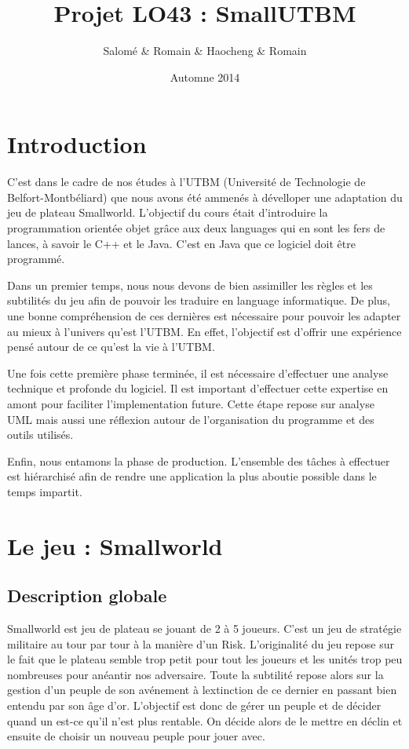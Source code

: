 \documentclass[11pt]{report}
\title{ Projet LO43 : SmallUTBM}
\author{Salomé \bsc{Welche} \& Romain \bsc{Dulieu} \& Haocheng \bsc{Xu} \& Romain \bsc{Thibaud}}
\date{Automne 2014}
\begin{document}
\maketitle

\tableofcontents

\chapter{Introduction}

C'est dans le cadre de nos études à l'UTBM (Université de Technologie de Belfort-Montbéliard) que nous avons été ammenés à dévelloper une adaptation du jeu de plateau Smallworld\up{\copyright}. L'objectif du cours était d'introduire la programmation orientée objet grâce aux deux languages qui en sont les fers de lances, à savoir le C++ et le Java. C'est en Java que ce logiciel doit être programmé. 

Dans un premier temps, nous nous devons de bien assimiller les règles et les subtilités du jeu afin de pouvoir les traduire en language informatique. De plus, une bonne compréhension de ces dernières est nécessaire pour pouvoir les adapter au mieux à l'univers qu'est l'UTBM. En effet, l'objectif est d'offrir une expérience pensé autour de ce qu'est la vie à l'UTBM.

Une fois cette première phase terminée, il est nécessaire d'effectuer une analyse technique et profonde du logiciel. Il est important d'effectuer cette expertise en amont pour faciliter l'implementation future. Cette étape repose sur analyse UML mais aussi une réflexion autour de l'organisation du programme et des outils utilisés.

Enfin, nous entamons la phase de production. L'ensemble des tâches à effectuer est hiérarchisé afin de rendre une application la plus aboutie possible dans le temps impartit.

\chapter{Le jeu : Smallworld}

	\section{Description globale}
		Smallworld\up{\copyright} est jeu de plateau se jouant de 2 à 5 joueurs. C'est un jeu de stratégie militaire au tour par tour à la manière d'un Risk\up{\copyright}. L'originalité du jeu repose sur le fait que le plateau semble trop petit pour tout les joueurs et les unités trop peu nombreuses pour anéantir nos adversaire. Toute la subtilité repose alors sur la gestion d'un peuple de son avénement à lextinction de ce dernier en passant bien entendu par son âge d'or. L'objectif est donc de gérer un peuple et de décider quand un est-ce qu'il n'est plus rentable. On décide alors de le mettre en déclin et ensuite de choisir un nouveau peuple pour jouer avec. 
		
\end{document}
